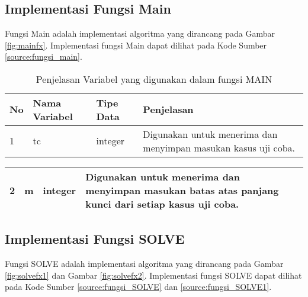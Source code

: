 \subsection{Implementasi Fungsi Main}
Fungsi Main adalah implementasi algoritma yang dirancang pada Gambar \ref{fig:mainfx}. Implementasi fungsi Main dapat dilihat pada Kode Sumber \ref{source:fungsi_main}.



\begin{table}[H]
	 	\caption{Penjelasan Variabel yang digunakan dalam fungsi MAIN}
		\begin{tabular}   {|p{0.5cm}|p{2.5cm}|p{2cm}|p{4cm}|}\hline
		No&Nama Variabel&Tipe Data&Penjelasan \\ \hline
		1&tc&integer&Digunakan untuk menerima dan menyimpan masukan kasus uji coba. \\ \hline
		\end{tabular}%
		\label{tab:mainvar}
	\end{table}


\begin{table}[H]
		\begin{tabular}   {|p{0.5cm}|p{2.5cm}|p{2cm}|p{4cm}|}\hline
		2&m&integer&Digunakan untuk menerima dan menyimpan masukan batas atas panjang kunci dari setiap kasus uji coba. \\ \hline
		\end{tabular}%
		\label{tab:mainvar}
	\end{table}


\subsection{Implementasi Fungsi SOLVE}
Fungsi SOLVE adalah implementasi algoritma yang dirancang pada Gambar \ref{fig:solvefx1} dan Gambar \ref{fig:solvefx2}. Implementasi fungsi SOLVE dapat dilihat pada Kode Sumber \ref{source:fungsi_SOLVE} dan \ref{source:fungsi_SOLVE1}.


